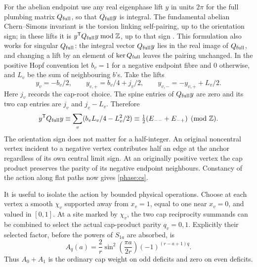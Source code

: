 For the abelian endpoint use any real eigenphase lift \(y\) in units \(2\pi\) for the full plumbing matrix \(Q_{\rm full}\), so that \(Q_{\rm full}y\) is integral. The fundamental abelian Chern--Simons invariant is the torsion linking self-pairing, up to the orientation sign; in these lifts it is \(y^{\mathsf T}Q_{\rm full}y\bmod\mathbb Z\), up to that sign \cite{Auckly}. This formulation also works for singular \(Q_{\rm full}\): the integral vector \(Q_{\rm full}y\) lies in the real image of \(Q_{\rm full}\), and changing a lift by an element of \(\ker Q_{\rm full}\) leaves the pairing unchanged. In the positive Hopf convention let \(b_v=1\) for a negative endpoint fibre and \(0\) otherwise, and \(L_v\) be the sum of neighbouring \(b\)'s. Take the lifts
\[
 y_v=-b_v/2,\qquad
 y_{v,+}=b_v/4+j_v/2,\qquad y_{v,-}=-y_{v,+}+L_v/2.
\]
Here \(j_v\) records the cap-root choice. The spine entries of \(Q_{\rm full}y\) are zero and its two cap entries are \(j_v\) and \(j_v-L_v\). Therefore
\[
 y^{\mathsf T}Q_{\rm full}y\equiv\sum_v(b_vL_v/4-L_v^2/2)
   \equiv \tfrac12(E_{--}+E_{-+})\pmod{\mathbb Z}.
\]
The orientation sign does not matter for a half-integer. An original noncentral vertex incident to a negative vertex contributes half an edge at the anchor regardless of its own central limit sign. At an originally positive vertex the cap product preserves the parity of its negative endpoint neighbours. Constancy of the action along flat paths now gives \eqref{phase:cs}.

It is useful to isolate the action by bounded physical operations. Choose at each vertex a smooth \(\chi_v\) supported away from \(x_v=1\), equal to one near \(x_v=0\), and valued in \([0,1]\). At a site marked by \(\chi_v\), the two cap reciprocity summands can be combined to select the actual cap-product parity \(q_v=0,1\). Explicitly their selected factor, before the powers of \(S_{1a}\) are absorbed, is
\begin{equation}
 A_q(a)=\frac2r\sin^2\!\left(\frac{\pi a}{2r}\right)(-1)^{(r-a+1)q}.
 \label{phase:tag}
\end{equation}
Thus \(A_0+A_1\) is the ordinary cap weight on odd deficits and zero on even deficits.

